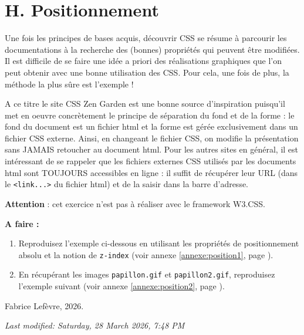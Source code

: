\documentclass[a4paper,11pt]{article}
\begin{document}
\section{H. Positionnement}

Une fois les principes de bases acquis, découvrir CSS se résume à parcourir les documentations à la recherche des (bonnes) propriétés qui peuvent être modifiées. Il est difficile de se faire une idée a priori des réalisations graphiques que l'on peut obtenir avec une bonne utilisation des CSS. Pour cela, une fois de plus, la méthode la plus sûre est l'exemple !

A ce titre le site \textcolor{violetuniv}{CSS Zen Garden} est une bonne source d'inspiration puisqu'il met en oeuvre concrètement le principe de séparation du fond et de la forme : le fond du document est un fichier html et la forme est gérée exclusivement dans un fichier CSS externe. Ainsi, en changeant le fichier CSS, on modifie la présentation sans JAMAIS retoucher au document html. Pour les autres sites en général, il est intéressant de se rappeler que les fichiers externes CSS utilisés par les documents html sont TOUJOURS accessibles en ligne : il suffit de récupérer leur URL (dans le \textcolor{rose}{\texttt{<link...>}} du fichier html) et de la saisir dans la barre d'adresse.

\textbf{Attention} : cet exercice n'est pas à réaliser avec le framework W3.CSS.

\begin{afaire}
\textbf{A faire :}

\begin{enumerate}
    \item Reproduisez l'exemple ci-dessous en utilisant les propriétés de positionnement absolu et la notion de \texttt{z-index}
    (voir annexe \ref{annexe:position1}, page \pageref{annexe:position1}).
    \item En récupérant les images \texttt{papillon.gif} et \texttt{papillon2.gif}, reproduisez l'exemple suivant
    (voir annexe \ref{annexe:position2}, page \pageref{annexe:position2}).
\end{enumerate}
\end{afaire}

\vspace{1em}
\noindent\textcopyright{} Fabrice Lefèvre, 2026.

\vspace{0.5em}
\noindent\textit{Last modified: Saturday, 28 March 2026, 7:48 PM}
\end{document}
